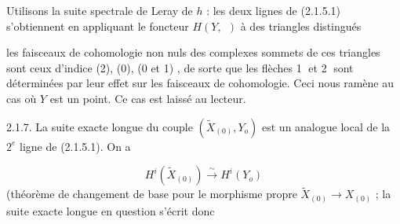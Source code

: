 Utilisons la suite spectrale de Leray de $h$ : les deux lignes de (2.1.5.1) s'obtiennent en appliquant le foncteur $H(Y,\ \ )$ à des triangles distingués

\begin{center}
\end{center}
les faisceaux de cohomologie non nuls des complexes sommets de ces triangles sont ceux d'indice (2), (0), (0 et 1) , de sorte que les flèches \textcircled{\scriptsize 1} et \textcircled{\scriptsize 2} sont déterminées par leur effet sur les faisceaux de cohomologie. Ceci nous ramène au cas où $Y$ est un point. Ce cas est laissé au lecteur.

2.1.7.  La suite exacte longue du couple $(\widetilde{X}_{(0)},Y_o)$ est un analogue local de la $2^e$ ligne de (2.1.5.1). On a

\begin{equation*}
H^i(\widetilde{X}_{(0)}) \stackrel{\sim}{\longrightarrow} H^i(Y_o)
\end{equation*}
(théorème de changement de base pour le morphisme propre $\widetilde{X}_{(0)} \to X_{(0)}$ ; la suite exacte longue en question s'écrit donc 


